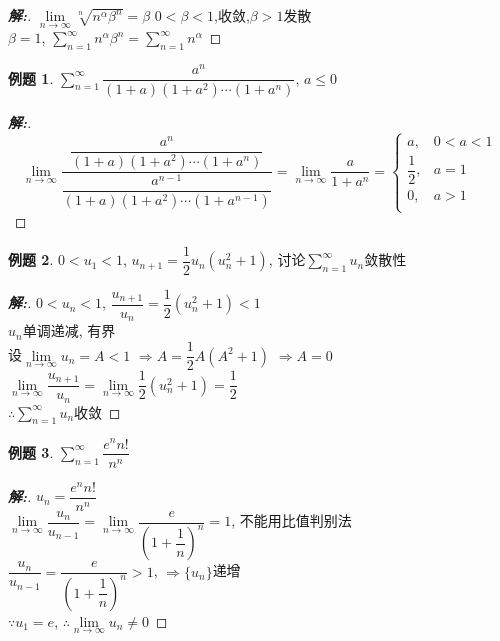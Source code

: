 \documentclass[12pt,a4paper]{ctexart}
\newenvironment{solution}{\begin{proof}[\hspace{2em}\textbf{解:}]}{\end{proof}}
\theoremstyle{definition}%
\newtheorem{exercise}{\hspace{2em}例题}
\begin{document}
\begin{solution}
	$ \displaystyle\lim\limits_{n \to \infty}\sqrt[n]{n^\alpha \beta^n}=\beta $
	$ 0<\beta<1 $,收敛,$ \beta>1 $发散\\
	
	$ \beta=1 $, $ \displaystyle\sum_{n=1}^{\infty}n^\alpha \beta^n
	=\sum_{n=1}^{\infty}n^\alpha $

\end{solution}
\begin{exercise}
	$ \displaystyle\sum_{n=1}^{\infty}\dfrac{a^n}{(1+a)(1+a^2)\cdots(1+a^n)} $, $ a \le 0 $
\end{exercise}
\begin{solution}
	\begin{equation*}
	\lim\limits_{n \to \infty}\dfrac{\dfrac{a^n}{(1+a)(1+a^2)\cdots(1+a^n)}}{\dfrac{a^{n-1}}{(1+a)(1+a^2)\cdots(1+a^{n-1})}}
	=\lim\limits_{n \to \infty}\dfrac{a}{1+a^n}
	=\begin{cases}
	a,&0<a<1\\
	\dfrac{1}{2},&a=1\\
	0,&a>1\\
	\end{cases}
	\end{equation*}
\end{solution}
\begin{exercise}
	$ 0<u_1<1 $, $ u_{n+1}=\dfrac{1}{2}u_n(u_n^2+1) $, 讨论$ \displaystyle\sum_{n=1}^{\infty}u_n $敛散性
\end{exercise}
\begin{solution}
	$ 0<u_n<1 $, $ \dfrac{u_{n+1}}{u_n}=\dfrac{1}{2}(u_n^2+1)<1 $\\
	
	$ {u_n} $单调递减, 有界\\
	
	设$ \lim\limits_{n \to \infty}u_n=A<1 $
	$ \Rightarrow A=\dfrac{1}{2}A(A^2+1) $
	$ \Rightarrow A=0 $\\
	
	$ \lim\limits_{n \to \infty}\dfrac{u_{n+1}}{u_n}
	=\lim\limits_{n \to \infty}\dfrac{1}{2}(u_n^2+1)
	=\dfrac{1}{2} $\\
	
	$ \displaystyle\therefore\sum_{n=1}^{\infty}u_n $收敛
\end{solution}

\begin{exercise}
	$ \displaystyle\sum_{n=1}^{\infty}\dfrac{e^n n!}{n^n} $
\end{exercise}
\begin{solution}
	$ u_n=\dfrac{e^n n!}{n^n} $\\
	
	$ \lim\limits_{n \to \infty} \dfrac{u_n}{u_{n-1}}
	=\lim\limits_{n \to \infty}\dfrac{e}{(1+\dfrac{1}{n})^n}
	=1$, 不能用比值判别法\\
	
	$ \dfrac{u_n}{u_{n-1}}
	=\dfrac{e}{(1+\dfrac{1}{n})^n}
	>1 $, $ \Rightarrow\{u_n\} $递增\\
	
	$ \because u_1=e $, $ \therefore \lim\limits_{n \to \infty}u_n \ne 0 $
\end{solution}
\end{document}
